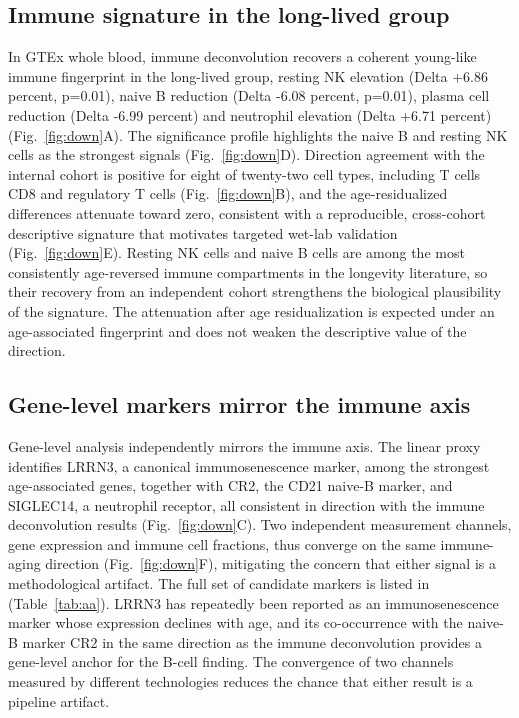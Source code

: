 \documentclass[unnumsec,webpdf,contemporary,large]{oup-authoring-template}
\begin{document}
\subsection{Immune signature in the long-lived group}\label{sec:res5}
In GTEx whole blood, immune deconvolution recovers a coherent young-like immune fingerprint in the long-lived group, resting NK elevation (Delta +6.86 percent, p=0.01), naive B reduction (Delta -6.08 percent, p=0.01), plasma cell reduction (Delta -6.99 percent) and neutrophil elevation (Delta +6.71 percent) (Fig.~\ref{fig:down}A). The significance profile highlights the naive B and resting NK cells as the strongest signals (Fig.~\ref{fig:down}D). Direction agreement with the internal cohort is positive for eight of twenty-two cell types, including T cells CD8 and regulatory T cells (Fig.~\ref{fig:down}B), and the age-residualized differences attenuate toward zero, consistent with a reproducible, cross-cohort descriptive signature that motivates targeted wet-lab validation (Fig.~\ref{fig:down}E). Resting NK cells and naive B cells are among the most consistently age-reversed immune compartments in the longevity literature, so their recovery from an independent cohort strengthens the biological plausibility of the signature. The attenuation after age residualization is expected under an age-associated fingerprint and does not weaken the descriptive value of the direction.

\subsection{Gene-level markers mirror the immune axis}\label{sec:res6}
Gene-level analysis independently mirrors the immune axis. The linear proxy identifies LRRN3, a canonical immunosenescence marker, among the strongest age-associated genes, together with CR2, the CD21 naive-B marker, and SIGLEC14, a neutrophil receptor, all consistent in direction with the immune deconvolution results (Fig.~\ref{fig:down}C). Two independent measurement channels, gene expression and immune cell fractions, thus converge on the same immune-aging direction (Fig.~\ref{fig:down}F), mitigating the concern that either signal is a methodological artifact. The full set of candidate markers is listed in (Table~\ref{tab:aa}). LRRN3 has repeatedly been reported as an immunosenescence marker whose expression declines with age, and its co-occurrence with the naive-B marker CR2 in the same direction as the immune deconvolution provides a gene-level anchor for the B-cell finding. The convergence of two channels measured by different technologies reduces the chance that either result is a pipeline artifact.
\end{document}
